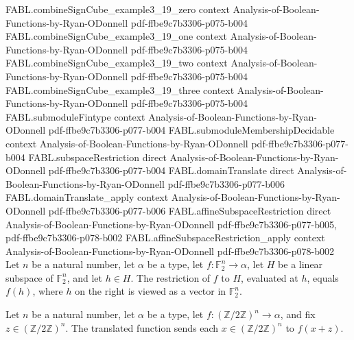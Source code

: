 \begin{theorem}
  {FABL.combineSignCube_example3_19_zero}
  {context}
  {Analysis-of-Boolean-Functions-by-Ryan-ODonnell}
  {pdf-ffbe9c7b3306-p075-b004}
\proofstep
  {FABL.combineSignCube_example3_19_one}
  {context}
  {Analysis-of-Boolean-Functions-by-Ryan-ODonnell}
  {pdf-ffbe9c7b3306-p075-b004}
\proofstep
  {FABL.combineSignCube_example3_19_two}
  {context}
  {Analysis-of-Boolean-Functions-by-Ryan-ODonnell}
  {pdf-ffbe9c7b3306-p075-b004}
\proofstep
  {FABL.combineSignCube_example3_19_three}
  {context}
  {Analysis-of-Boolean-Functions-by-Ryan-ODonnell}
  {pdf-ffbe9c7b3306-p075-b004}
\proofstep
  {FABL.submoduleFintype}
  {context}
  {Analysis-of-Boolean-Functions-by-Ryan-ODonnell}
  {pdf-ffbe9c7b3306-p077-b004}
\proofstep
  {FABL.submoduleMembershipDecidable}
  {context}
  {Analysis-of-Boolean-Functions-by-Ryan-ODonnell}
  {pdf-ffbe9c7b3306-p077-b004}
\proofstep
  {FABL.subspaceRestriction}
  {direct}
  {Analysis-of-Boolean-Functions-by-Ryan-ODonnell}
  {pdf-ffbe9c7b3306-p077-b004}
\proofstep
  {FABL.domainTranslate}
  {direct}
  {Analysis-of-Boolean-Functions-by-Ryan-ODonnell}
  {pdf-ffbe9c7b3306-p077-b006}
\proofstep
  {FABL.domainTranslate_apply}
  {context}
  {Analysis-of-Boolean-Functions-by-Ryan-ODonnell}
  {pdf-ffbe9c7b3306-p077-b006}
\proofstep
  {FABL.affineSubspaceRestriction}
  {direct}
  {Analysis-of-Boolean-Functions-by-Ryan-ODonnell}
  {pdf-ffbe9c7b3306-p077-b005,
    pdf-ffbe9c7b3306-p078-b002}
\proofstep
  {FABL.affineSubspaceRestriction_apply}
  {context}
  {Analysis-of-Boolean-Functions-by-Ryan-ODonnell}
  {pdf-ffbe9c7b3306-p078-b002}
Let $n$ be a natural number, let $\alpha$ be a type, let $f:\mathbb{F}_2^n\to\alpha$,
let $H$ be a linear subspace of $\mathbb{F}_2^n$, and let $h\in H$. The restriction of
$f$ to $H$, evaluated at $h$, equals $f(h)$, where $h$ on the right is viewed as a
vector in $\mathbb{F}_2^n$.
\end{theorem}

\begin{definition}
\label{FABL.domainTranslate}
\leanok
Let $n$ be a natural number, let $\alpha$ be a type, let
$f:(\mathbb{Z}/2\mathbb{Z})^n\to\alpha$, and fix $z\in(\mathbb{Z}/2\mathbb{Z})^n$. The
translated function sends each $x\in(\mathbb{Z}/2\mathbb{Z})^n$ to $f(x+z)$.
\end{definition}

